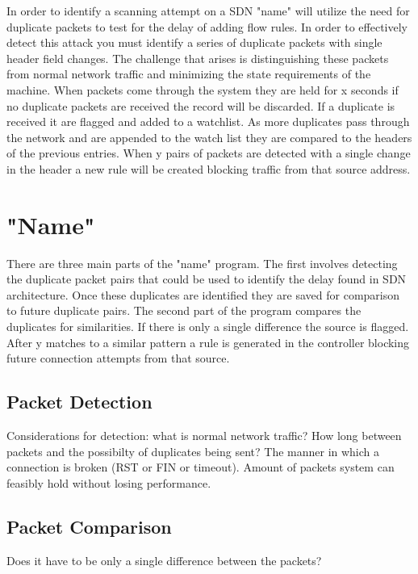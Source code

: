 \documentclass[twocolumn]{article}
\begin{document}
	In order to identify a scanning attempt on a SDN "name" will utilize the need for duplicate packets to test for the delay of adding flow rules. In order to effectively detect this attack you must identify a series of duplicate packets with single header field changes. The challenge that arises is distinguishing these packets from normal network traffic and minimizing the state requirements of the machine. When packets come through the system they are held for x seconds if no duplicate packets are received the record will be discarded. If a duplicate is received it are flagged and added to a watchlist. As more duplicates pass through the network and are appended to the watch list they are compared to the headers of the previous entries. When y pairs of packets are detected with a single change in the header a new rule will be created blocking traffic from that source address.

\section{"Name"}

There are three main parts of the "name" program. The first involves detecting the duplicate packet pairs that could be used to identify the delay found in SDN architecture. Once these duplicates are identified they are saved for comparison to future duplicate pairs. The second part of the program compares the duplicates for similarities. If there is only a single difference the source is flagged. After y matches to a similar pattern a rule is generated in the controller blocking future connection attempts from that source. 

\subsection{Packet Detection}

Considerations for detection: what is normal network traffic? How long between packets and the possibilty of duplicates being sent? The manner in which a connection is broken (RST or FIN or timeout). Amount of packets system can feasibly hold without losing performance. 

\subsection{Packet Comparison}

Does it have to be only a single difference between the packets? 
\end{document}
